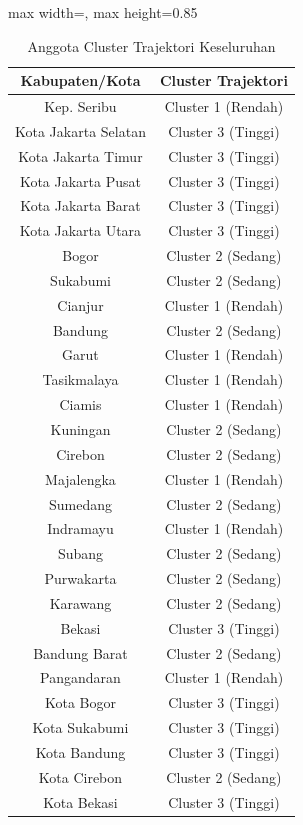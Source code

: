 \begin{table}[H]
\centering
\caption{Anggota Cluster Trajektori Keseluruhan} \label{tab:appclustermembers}
\begin{adjustbox}{max width=\textwidth, max height=0.85\textheight}
\begin{tabular}{|c|c|}
\hline
\textbf{Kabupaten/Kota} & \textbf{Cluster Trajektori} \\
\hline
Kep. Seribu & Cluster 1 (Rendah) \\
Kota Jakarta Selatan & Cluster 3 (Tinggi) \\
Kota Jakarta Timur & Cluster 3 (Tinggi) \\
Kota Jakarta Pusat & Cluster 3 (Tinggi) \\
Kota Jakarta Barat & Cluster 3 (Tinggi) \\
Kota Jakarta Utara & Cluster 3 (Tinggi) \\
Bogor & Cluster 2 (Sedang) \\
Sukabumi & Cluster 2 (Sedang) \\
Cianjur & Cluster 1 (Rendah) \\
Bandung & Cluster 2 (Sedang) \\
Garut & Cluster 1 (Rendah) \\
Tasikmalaya & Cluster 1 (Rendah) \\
Ciamis & Cluster 1 (Rendah) \\
Kuningan & Cluster 2 (Sedang) \\
Cirebon & Cluster 2 (Sedang) \\
Majalengka & Cluster 1 (Rendah) \\
Sumedang & Cluster 2 (Sedang) \\
Indramayu & Cluster 1 (Rendah) \\
Subang & Cluster 2 (Sedang) \\
Purwakarta & Cluster 2 (Sedang) \\
Karawang & Cluster 2 (Sedang) \\
Bekasi & Cluster 3 (Tinggi) \\
Bandung Barat & Cluster 2 (Sedang) \\
Pangandaran & Cluster 1 (Rendah) \\
Kota Bogor & Cluster 3 (Tinggi) \\
Kota Sukabumi & Cluster 3 (Tinggi) \\
Kota Bandung & Cluster 3 (Tinggi) \\
Kota Cirebon & Cluster 2 (Sedang) \\
Kota Bekasi & Cluster 3 (Tinggi) \\

\end{tabular}
\end{adjustbox}
\end{table}
